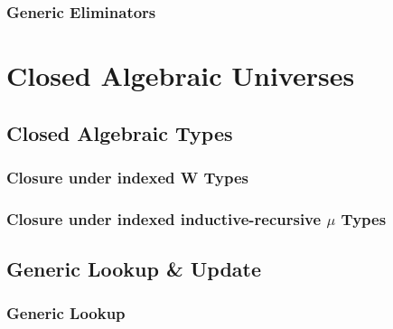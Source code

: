\documentclass[12pt]{report}
\theoremstyle{definition}
\theoremstyle{remark}
\numberwithin{definition}{section}
\numberwithin{equation}{section}
\numberwithin{proposition}{section}
\numberwithin{conjecture}{section}
\numberwithin{theorem}{section}
\numberwithin{lemma}{section}
\numberwithin{corollary}{section}
\numberwithin{example}{section}
\numberwithin{remark}{section}
\begin{document}
\section{Generic Eliminators}





\part{Closed Algebraic Universes}\label{part:closed}




\chapter{Closed Algebraic Types}\label{ch:closed}
\section{Closure under indexed W Types}
\section{Closure under indexed inductive-recursive $\mu$ Types}

\chapter{Generic Lookup \& Update}\label{ch:gupdate}
\section{Generic Lookup}
\end{document}

